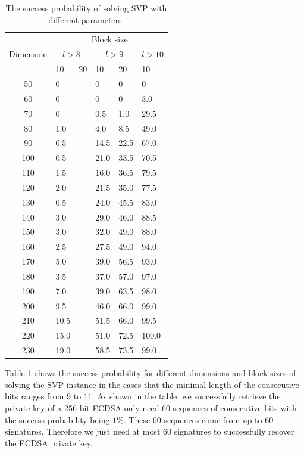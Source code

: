 \begin{table}[t]
  \centering
  \caption{The success probability of solving SVP with different parameters.}
  \label{svp9}
    \begin{tabular}{|c|m{0.5in}<{\centering}|m{0.5in}<{\centering}|m{0.5in}<{\centering}|m{0.5in}<{\centering}|m{0.5in}<{\centering}|}
    \hline
    \multirow{3}{*}{Dimension}&
    \multicolumn{5}{c|}{Block size}   \\ %
    \cline{2-6}
    ~& \multicolumn{2}{c|}{$l > 8$} & \multicolumn{2}{c|}{$l > 9$} & $l > 10$  \\
    \cline{2-6}
    ~& 10 & 20 & 10 & 20  & 10 \\
  \hline
  50 & 0  &   & 0 & 0 & 0   \\
  \hline
  60 & 0  &   & 0 & 0 &  3.0    \\
  \hline
  70 & 0  &   & 0.5 & 1.0  &  29.5    \\
  \hline
  80 & 1.0  &  & 4.0 & 8.5 &  49.0  \\
  \hline
  90 & 0.5  &  & 14.5 & 22.5 & 67.0   \\
  \hline
  100 & 0.5  &  & 21.0 & 33.5 & 70.5  \\
  \hline
  110 & 1.5  &  & 16.0 & 36.5 &  79.5 \\
  \hline
  120 & 2.0  &  & 21.5 & 35.0 &  77.5  \\
  \hline
  130 & 0.5  &  & 24.0 & 45.5 &  83.0  \\
  \hline
  140 &  3.0 &  & 29.0 & 46.0 &  88.5   \\
  \hline
  150 & 3.0  &  & 32.0 & 49.0 &  88.0  \\
  \hline
  160 & 2.5  &  & 27.5 & 49.0 &  94.0  \\
  \hline
  170 & 5.0  &  & 39.0 & 56.5 &  93.0  \\
  \hline
  180 & 3.5  &  & 37.0 & 57.0 &  97.0  \\
  \hline
  190 & 7.0  &  & 39.0 & 63.5 &  98.0  \\
  \hline
  200 & 9.5  &  & 46.0 & 66.0 &  99.0  \\
  \hline
  210 & 10.5  &  & 51.5 & 66.0 & 99.5   \\
  \hline
  220 & 15.0  &  & 51.0 & 72.5 & 100.0    \\
  \hline
  230 & 19.0  &  & 58.5 & 73.5 & 99.0  \\
  \hline
    \end{tabular}
\end{table}

Table \ref{svp9} shows the success probability for different dimensions and block sizes of solving the SVP instance in the
             cases that the minimal length of the consecutive bits ranges from $9$ to $11$.
As shown in the table, we successfully retrieve the private key of a 256-bit ECDSA only need $60$ sequences of consecutive bits with the success probability being $1\%$.
These $60$ sequences come from up to $60$ signatures.
Therefore we just need at most $60$ signatures to successfully recover the ECDSA private key.

